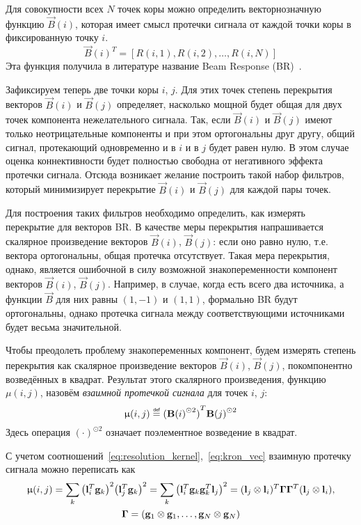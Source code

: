 Для совокупности всех $N$ точек коры можно определить векторнозначную функцию
$\vec{B}(i)$, которая имеет смысл протечки сигнала от каждой точки коры в
фиксированную точку $i$. 
\begin{equation}
    \vec{B}{(i)}^T = \left[R{(i, 1)}, R(i, 2), \ldots, R(i, N)\right]
\end{equation}
Эта функция получила в литературе название Beam Response (BR)~\cite{sekikhara_nagarajan}.


Зафиксируем теперь две точки коры $i$, $j$. Для этих точек степень перекрытия
векторов $\vec{B}(i)$ и $\vec{B}(j)$ определяет, насколько мощной будет общая
для двух точек компонента нежелательного сигнала. Так, если $\vec{B}(i)$ и
$\vec{B}(j)$ имеют только неотрицательные компоненты и при этом ортогональны
друг другу, общий сигнал, протекающий одновременно и в $i$ и в $j$ будет равен
нулю. В этом случае оценка коннективности будет полностью свободна от
негативного эффекта протечки сигнала. Отсюда возникает желание построить такой
набор фильтров, который минимизирует перекрытие $\vec{B}(i)$ и $\vec{B}(j)$ для
каждой пары точек.

Для построения таких фильтров необходимо определить, как измерять перекрытие
для векторов BR. В качестве меры перекрытия напрашивается скалярное
произведение векторов $\vec{B}(i)$, $\vec{B}(j)$: если оно равно нулю, т.е.
вектора ортогональны, общая протечка отсутствует. Такая мера перекрытия,
однако, является ошибочной в силу возможной знакопеременности компонент
векторов $\vec{B}(i)$, $\vec{B}(j)$. Например, в случае, когда есть всего два
источника, а функции $\vec{B}$ для них равны $(1, -1)$ и $(1, 1)$, формально BR
будут ортогональны, однако протечка сигнала между соответствующими источниками
будет весьма значительной.

Чтобы преодолеть проблему знакопеременных компонент, будем измерять степень
перекрытия как скалярное произведение векторов $\vec{B}(i)$, $\vec{B}(j)$,
покомпонентно возведённых в квадрат. Результат
этого скалярного произведения, функцию $\mu(i, j)$, назовём \emph{взаимной
протечкой сигнала} для точек $i$, $j$:
\begin{equation}
    \mu(i, j) \defeq {(\vec{B}{(i)}^{\odot 2})}^T \vec{B}{(j)}^{\odot 2}
    \label{eq:def_mutual_leakage}
\end{equation}
Здесь операция ${(\cdot)}^{\odot 2}$ означает поэлементное возведение в квадрат.

С учетом соотношений~\ref{eq:resolution_kernel},~\ref{eq:kron_vec} взаимную протечку сигнала можно переписать как
\begin{multline}
    \upmu(i, j)= \sum_k {\left(\mathbf{l}_i^T \mathbf{g}_k\right)}^2{\left(\mathbf{l}_j^T \mathbf{g}_k\right)}^2=
    \sum_k\left(\mathbf{l}_i^T \mathbf{g}_k\mathbf{g}_k^T \mathbf{l}_j\right)^2=(\mathbf{l}_j \otimes \mathbf{l}_i)^T \mathbf{\Gamma} \mathbf{\Gamma}^T(\mathbf{l}_j \otimes \mathbf{l}_i),\\
    \mathbf{\Gamma} = (\mathbf{g}_1 \otimes \mathbf{g}_1, \ldots, \mathbf{g}_N \otimes \mathbf{g}_N)
\end{multline}

